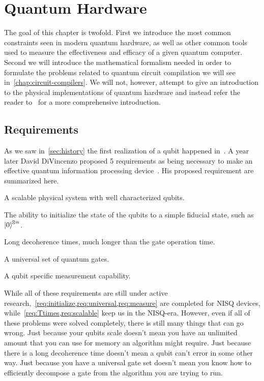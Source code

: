 \chapter{Quantum Hardware}\label{chap:hardware}

The goal of this chapter is twofold.
First we introduce the most common constraints seen in modern quantum hardware, as well as other common tools used to measure the effectiveness and efficacy of a given quantum computer.
Second we will introduce the mathematical formalism needed in order to formulate the problems related to quantum circuit compilation we will see in~\cref{chap:circuit-compilers}.
We will not, however, attempt to give an introduction to the physical implementations of quantum hardware and instead refer the reader to~\cite{nielsenchuang} for a more comprehensive introduction.

\section{Requirements}
As we saw in~\cref{sec:history} the first realization of a qubit happened in~\citeyear{firstqubit}.
A year later David DiVincenzo proposed 5 requirements as being necessary to make an effective quantum information processing device~\cite{divincenzo}.
His proposed requirement are summarized here.
\begin{requirements}
    \item A scalable physical system with well characterized qubits.\label{req:scalable}
    \item The ability to initialize the state of the qubits to a simple fiducial state, such as $\ket{0}^{\!\otimes n}$.\label{req:initialize}
    \item Long decoherence times, much longer than the gate operation time.\label{req:Ttimes}
    \item A universal set of quantum gates.\label{req:universal}
    \item A qubit specific measurement capability.\label{req:measure}
\end{requirements}
While all of these requirements are still under active research,~\cref{req:initialize,req:universal,req:measure} are completed for \ac{NISQ} devices, while~\cref{req:Ttimes,req:scalable} keep us in the \ac{NISQ}-era.
However, even if all of these problems were solved completely, there is still many things that can go wrong.
Just because your qubits scale doesn't mean you have an unlimited amount that you can use for memory an algorithm might require.
Just because there is a long decoherence time doesn't mean a qubit can't error in some other way.
Just because you have a universal gate set doesn't mean you know how to efficiently decompose a gate from the algorithm you are trying to run.


